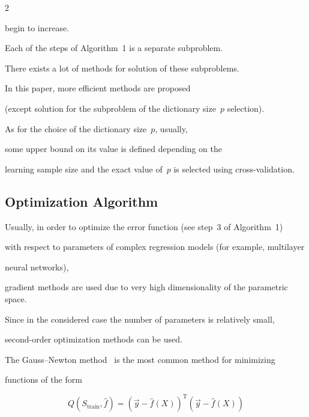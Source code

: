 \begin{multicols}{2}
\begin{enumerate}
\begin{itemize}
    begin to increase.

    \end{itemize}

  \end{enumerate}



\medskip



Each of the steps of Algorithm~1 is a separate subproblem. 

There exists a lot of methods for solution of these subproblems. 

In this paper, more efficient methods are proposed

(except solution for the subproblem of the dictionary size~$p$ selection).

As for the choice of the dictionary size~$p$, usually, 

some upper bound on its value is defined depending on the 

learning sample size and the exact value of~$p$ is selected using cross-validation.



\subsection{Optimization Algorithm}



\noindent

Usually, in order to optimize the error function (see step~3 of Algorithm~1) 

with respect to parameters of complex regression models (for example, multilayer 

neural networks),

gradient methods are used due to very high dimensionality of the parametric space.

Since in the considered case the number of parameters is relatively small,  

second-order optimization methods can be used.

The Gauss--Newton method~\cite{Nocedal} is the most common method for minimizing 

functions of the form

$$

Q\left({S_{\mathrm{train}}}, \hat f\right) = \left( \vec y - \hat f({X}) \right)^{\mathrm{T}} 

 \left( \vec y - \hat f({ X}) \right)

 $$


\end{multicols}
